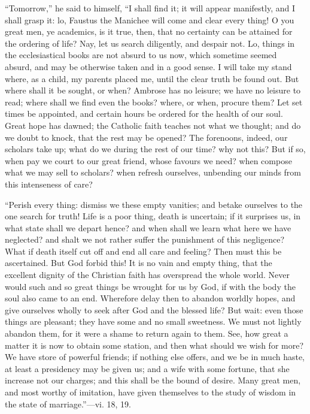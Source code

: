 ``Tomorrow,'' he said to himself, ``I shall find it; it
will appear manifestly, and I shall grasp it: lo, Faustus the Manichee
will come and clear every thing! O you great men, ye academics, is it
true, then, that no certainty can be attained for the ordering of
life? Nay, let us search diligently, and despair not. Lo, things in
the ecclesiastical books are not absurd to us now, which sometime
seemed absurd, and may be otherwise taken and in a good sense. I will
take my stand where, as a child, my parents placed me, until the clear
truth be found out. But where shall it be sought, or when? Ambrose has
no leisure; we have no leisure to read; where shall we find even the
books? where, or when, procure them? Let set times be appointed, and
certain hours be ordered for the health of our soul. Great hope has
dawned; the Catholic faith teaches not what we thought; and do we
doubt to knock, that the rest may be opened? The forenoons, indeed,
our scholars take up; what do we during the rest of our time? why not
this? But if so, when pay we court to our great friend, whose favours
we need? when compose what we may sell to scholars? when refresh
ourselves, unbending our minds from this intenseness of care?

``Perish every thing: dismiss we these empty vanities; and
betake ourselves to the one search for truth! Life is a poor thing,
death is uncertain; if it surprises us, in what state shall we depart
hence? and when shall we learn what here we have neglected? and shalt
we not rather suffer the punishment of this negligence? What if death
itself cut off and end all care and feeling? Then must this be
ascertained. But God forbid this! It is no vain and empty thing, that
the excellent dignity of the Christian faith has overspread the whole
world. Never would such and so great things be wrought for us by God,
if with the body the soul also came to an end. Wherefore delay then to
abandon worldly hopes, and give ourselves wholly to seek after God and
the blessed life? But wait: even those things are pleasant; they have
some and no small sweetness. We must not lightly abandon them, for it
were a shame to return again to them. See, how great a matter it is
now to obtain some station, and then what should we wish for more? We
have store of powerful friends; if nothing
else offers, and we be in much haste, at least a presidency may be
given us; and a wife with some fortune, that she increase not our
charges; and this shall be the bound of desire. Many great men, and
most worthy of imitation, have given themselves to the study of wisdom
in the state of marriage.''—vi. 18, 19.

